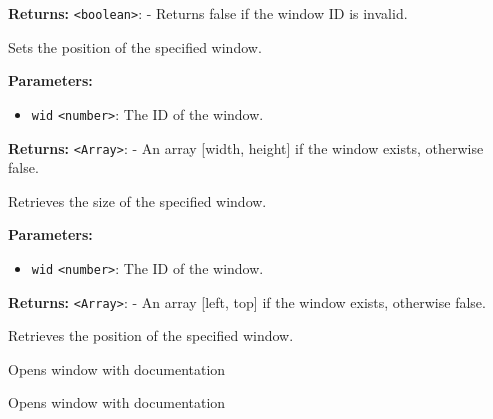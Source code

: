 \documentclass[12pt,a4paper]{article}
\begin{document}
\noindent \textbf{Returns:} \texttt{<boolean>}: - Returns false if the window ID is invalid.

\noindent Sets the position of the specified window.

\vspace{5mm}
\noindent {}


\noindent \textbf{Parameters:}
\begin{itemize}
  \item \texttt{wid} \texttt{<number>}: The ID of the window.
\end{itemize}

\noindent \textbf{Returns:} \texttt{<Array>}: - An array [width, height] if the window exists, otherwise false.

\noindent Retrieves the size of the specified window.

\vspace{5mm}
\noindent {}


\noindent \textbf{Parameters:}
\begin{itemize}
  \item \texttt{wid} \texttt{<number>}: The ID of the window.
\end{itemize}

\noindent \textbf{Returns:} \texttt{<Array>}: - An array [left, top] if the window exists, otherwise false.

\noindent Retrieves the position of the specified window.

\vspace{5mm}
\noindent {}


\noindent Opens window with documentation

\vspace{5mm}
\noindent {}


\noindent Opens window with documentation

\vspace{5mm}
\noindent {}
\end{document}
